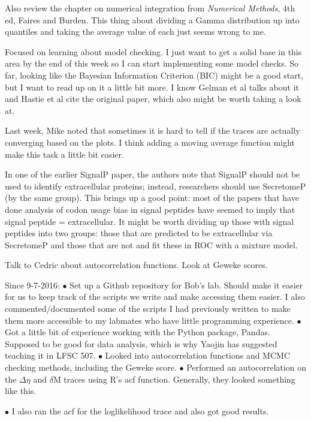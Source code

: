 \documentclass[11pt]{labbook}
\begin{document}
Also review the chapter on numerical integration from \textit{Numerical Methods}, 4th ed, Faires and Burden. This thing about dividing a Gamma distribution up into quantiles and taking the average value of each just seems wrong to me. 

Focused on learning about model checking. I just want to get a solid base in this area by the end of this week so I can start implementing some model checks. So far, looking like the Bayesian Information Criterion (BIC) might be a good start, but I want to read up on it a little bit more. I know Gelman et al talks about it and Hastie et al cite the original paper, which also might be worth taking a look at. 

Last week, Mike noted that sometimes it is hard to tell if the traces are actually converging based on the plots. I think adding a moving average function might make this task a little bit easier. 

In one of the earlier SignalP paper, the authors note that SignalP should not be used to identify extracellular proteins; instead, researchers should use SecretomeP (by the same group). This brings up a good point: most of the papers that have done analysis of codon usage bias in signal peptides have seemed to imply that signal peptide = extracellular. It might be worth dividing up those with signal peptides into two groups: those that are predicted to be extracellular via SecretomeP and those that are not and fit these in ROC with a mixture model. 

Talk to Cedric about autocorrelation functions. Look at Geweke scores. 


Since 9-7-2016:
$\bullet$ Set up a Github repository for Bob's lab. Should make it easier for us to keep track of the scripts we write and make accessing them easier. I also commented/documented some of the scripts I had previously written to make them more accessible to my labmates who have little programming experience. \newline
$\bullet$ Got a little bit of experience working with the Python package, Pandas. Supposed to be good for data analysis, which is why Yaojin has suggested teaching it in LFSC 507. \newline
$\bullet$ Looked into autocorrelation functions and MCMC checking methods, including the Geweke score. \newline
$\bullet$ Performed an autocorrelation on the $\Delta\eta$ and $\delta$M traces using R's acf function. Generally, they looked something like this.



$\bullet$ I also ran the acf for the loglikelihood trace and also got good results.


\end{document}
